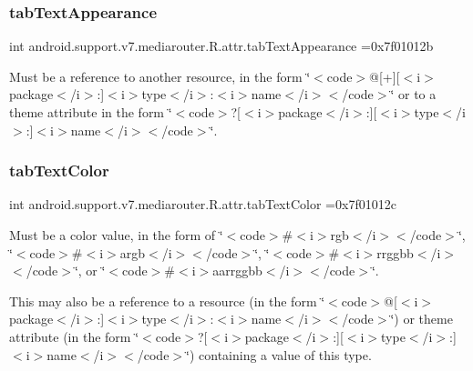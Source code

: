 \subsubsection{\texorpdfstring{tab\+Text\+Appearance}{tabTextAppearance}}
{\footnotesize\ttfamily int android.\+support.\+v7.\+mediarouter.\+R.\+attr.\+tab\+Text\+Appearance =0x7f01012b\hspace{0.3cm}{\ttfamily [static]}}

Must be a reference to another resource, in the form \char`\"{}$<$code$>$@\mbox{[}+\mbox{]}\mbox{[}$<$i$>$package$<$/i$>$\+:\mbox{]}$<$i$>$type$<$/i$>$\+:$<$i$>$name$<$/i$>$$<$/code$>$\char`\"{} or to a theme attribute in the form \char`\"{}$<$code$>$?\mbox{[}$<$i$>$package$<$/i$>$\+:\mbox{]}\mbox{[}$<$i$>$type$<$/i$>$\+:\mbox{]}$<$i$>$name$<$/i$>$$<$/code$>$\char`\"{}. \mbox{\label{classandroid_1_1support_1_1v7_1_1mediarouter_1_1R_1_1attr_ac6c22cc3afe53aa6685979988be4035f}} 
\subsubsection{\texorpdfstring{tab\+Text\+Color}{tabTextColor}}
{\footnotesize\ttfamily int android.\+support.\+v7.\+mediarouter.\+R.\+attr.\+tab\+Text\+Color =0x7f01012c\hspace{0.3cm}{\ttfamily [static]}}

Must be a color value, in the form of \char`\"{}$<$code$>$\#$<$i$>$rgb$<$/i$>$$<$/code$>$\char`\"{}, \char`\"{}$<$code$>$\#$<$i$>$argb$<$/i$>$$<$/code$>$\char`\"{}, \char`\"{}$<$code$>$\#$<$i$>$rrggbb$<$/i$>$$<$/code$>$\char`\"{}, or \char`\"{}$<$code$>$\#$<$i$>$aarrggbb$<$/i$>$$<$/code$>$\char`\"{}. 

This may also be a reference to a resource (in the form \char`\"{}$<$code$>$@\mbox{[}$<$i$>$package$<$/i$>$\+:\mbox{]}$<$i$>$type$<$/i$>$\+:$<$i$>$name$<$/i$>$$<$/code$>$\char`\"{}) or theme attribute (in the form \char`\"{}$<$code$>$?\mbox{[}$<$i$>$package$<$/i$>$\+:\mbox{]}\mbox{[}$<$i$>$type$<$/i$>$\+:\mbox{]}$<$i$>$name$<$/i$>$$<$/code$>$\char`\"{}) containing a value of this type. \mbox{\label{classandroid_1_1support_1_1v7_1_1mediarouter_1_1R_1_1attr_a3512dcd83093488c2c75e79b3685e5a2}} 
